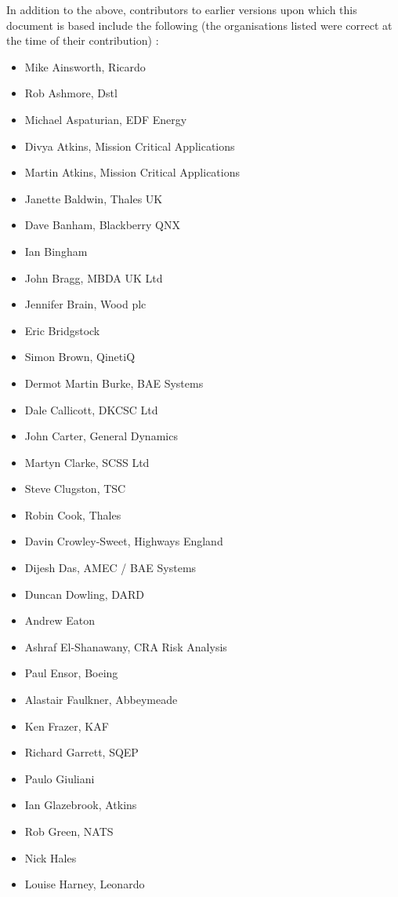 In addition to the above,
contributors to earlier versions upon which this document is based include the following
(the organisations listed were correct at the time of their contribution)
:
\begin{itemize}
  \item Mike Ainsworth, Ricardo
  \item Rob Ashmore, Dstl
  \item Michael Aspaturian, EDF Energy
  \item Divya Atkins, Mission Critical Applications
  \item Martin Atkins, Mission Critical Applications
  \item Janette Baldwin, Thales UK
  \item Dave Banham, Blackberry QNX
  \item Ian Bingham
  \item John Bragg, MBDA UK Ltd
  \item Jennifer Brain, Wood plc
  \item Eric Bridgstock
  \item Simon Brown, QinetiQ
  \item Dermot Martin Burke, BAE Systems
  \item Dale Callicott, DKCSC Ltd
  \item John Carter, General Dynamics
  \item Martyn Clarke, SCSS Ltd
  \item Steve Clugston, TSC
  \item Robin Cook, Thales
  \item Davin Crowley-Sweet, Highways England
  \item Dijesh Das, AMEC / BAE Systems
  \item Duncan Dowling, DARD
  \item Andrew Eaton
  \item Ashraf El-Shanawany, CRA Risk Analysis
  \item Paul Ensor, Boeing 
  \item Alastair Faulkner, Abbeymeade
  \item Ken Frazer, KAF
  \item Richard Garrett, SQEP
  \item Paulo Giuliani
  \item Ian Glazebrook, Atkins
  \item Rob Green, NATS
  \item Nick Hales
    \item Louise Harney, Leonardo

\end{itemize}
